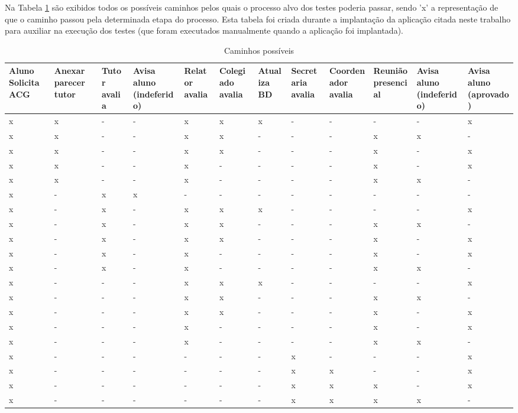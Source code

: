 \documentclass[12pt]{article}
\begin{document}
Na Tabela \ref{tab:tabelaCaminhos} são exibidos todos os possíveis caminhos pelos quais o processo alvo dos testes poderia passar, sendo 'x' a representação de que o caminho passou pela determinada etapa do processo. Esta tabela foi criada durante a implantação da aplicação citada neste trabalho para auxiliar na execução dos testes (que foram executados manualmente quando a aplicação foi implantada).

\begin{table}
{\scriptsize
\begin{tabular}{|p{1cm}|p{1cm}|p{1cm}|p{1cm}|p{1cm}|p{1cm}|p{1cm}|p{1cm}|p{1cm}|p{1cm}|p{1cm}|p{1cm}|}
\hline
Aluno Solicita ACG & Anexar parecer tutor & Tutor avalia & Avisa aluno (indeferido) & Rela\-tor avalia & Cole\-giado avalia & Atu\-aliza BD & Secre\-taria avalia & Coorde\-nador avalia & Reuni\-ão presencial & Avisa aluno (indeferido) & Avisa aluno (aprovado) \\\hline
x & x & - & - & x & x & x & - & - & - & - & x\\\hline
x & x & - & - & x & x & - & - & - & x & x & -\\\hline
x & x & - & - & x & x & - & - & - & x & - & x\\\hline
x & x & - & - & x & - & - & - & - & x & - & x\\\hline
x & x & - & - & x & - & - & - & - & x & x & -\\\hline
x & - & x & x & - & - & - & - & - & - & - & -\\\hline
x & - & x & - & x & x & x & - & - & - & - & x\\\hline
x & - & x & - & x & x & - & - & - & x & x & -\\\hline
x & - & x & - & x & x & - & - & - & x & - & x\\\hline
x & - & x & - & x & - & - & - & - & x & - & x\\\hline
x & - & x & - & x & - & - & - & - & x & x & -\\\hline
x & - & - & - & x & x & x & - & - & - & - & x\\\hline
x & - & - & - & x & x & - & - & - & x & x & -\\\hline
x & - & - & - & x & x & - & - & - & x & - & x\\\hline
x & - & - & - & x & - & - & - & - & x & - & x\\\hline
x & - & - & - & x & - & - & - & - & x & x & -\\\hline
x & - & - & - & - & - & - & x & - & - & - & x\\\hline
x & - & - & - & - & - & - & x & x & - & - & x\\\hline
x & - & - & - & - & - & - & x & x & x & - & x\\\hline
x & - & - & - & - & - & - & x & x & x & x & -\\\hline
\end{tabular}
}
\caption{Caminhos possíveis}
\label{tab:tabelaCaminhos}
\end{table}
\end{document}
